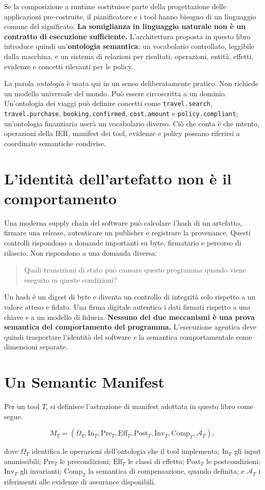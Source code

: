 \documentclass[10pt,oneside,openany]{book}
\newcommand{\term}[1]{\textbf{#1}}
\newcommand{\mono}[1]{\texttt{#1}}
\begin{document}
Se la composizione a runtime sostituisce parte della progettazione delle applicazioni pre-costruite, il pianificatore e i tool hanno bisogno di un linguaggio comune del significato. \textbf{La somiglianza in linguaggio naturale non è un contratto di esecuzione sufficiente.} L'architettura proposta in questo libro introduce quindi un'\term{ontologia semantica}: un vocabolario controllato, leggibile dalla macchina, e un sistema di relazioni per risultati, operazioni, entità, effetti, evidenze e concetti rilevanti per le policy.

La parola \emph{ontologia} è usata qui in un senso deliberatamente pratico. Non richiede un modello universale del mondo. Può essere circoscritta a un dominio. Un'ontologia dei viaggi può definire concetti come \mono{travel.search}, \mono{travel.purchase}, \mono{booking.confirmed}, \mono{cost.amount} e \mono{policy.compliant}; un'ontologia finanziaria userà un vocabolario diverso. Ciò che conta è che intento, operazioni della IER, manifest dei tool, evidenze e policy possano riferirsi a coordinate semantiche condivise.

\section{L'identità dell'artefatto non è il comportamento}
Una moderna supply chain del software può calcolare l'hash di un artefatto, firmare una release, autenticare un publisher e registrare la provenance. Questi controlli rispondono a domande importanti su byte, firmatario e percorso di rilascio. Non rispondono a una domanda diversa:

\begin{quote}
Quali transizioni di stato può causare questo programma quando viene eseguito in queste condizioni?
\end{quote}

Un hash è un digest di byte e diventa un controllo di integrità solo rispetto a un valore atteso e fidato. Una firma digitale autentica i dati firmati rispetto a una chiave e a un modello di fiducia. \textbf{Nessuno dei due meccanismi è una prova semantica del comportamento del programma.} L'esecuzione agentica deve quindi trasportare l'identità del software \emph{e} la semantica comportamentale come dimensioni separate.

\section{Un Semantic Manifest}
Per un tool $T$, si definisce l'astrazione di manifest adottata in questo libro come segue.
\begin{formulabox}
\[
M_T=(\Omega_T,\mathrm{In}_T,\mathrm{Pre}_T,\mathrm{Eff}_T,\mathrm{Post}_T,\mathrm{Inv}_T,\mathrm{Comp}_T,\mathcal{A}_T),
\]
\end{formulabox}
dove $\Omega_T$ identifica le operazioni dell'ontologia che il tool implementa; $\mathrm{In}_T$ gli input ammissibili; $\mathrm{Pre}_T$ le precondizioni; $\mathrm{Eff}_T$ le classi di effetto; $\mathrm{Post}_T$ le postcondizioni; $\mathrm{Inv}_T$ gli invarianti; $\mathrm{Comp}_T$ la semantica di compensazione, quando definita; e $\mathcal{A}_T$ i riferimenti alle evidenze di assurance disponibili.
\end{document}
